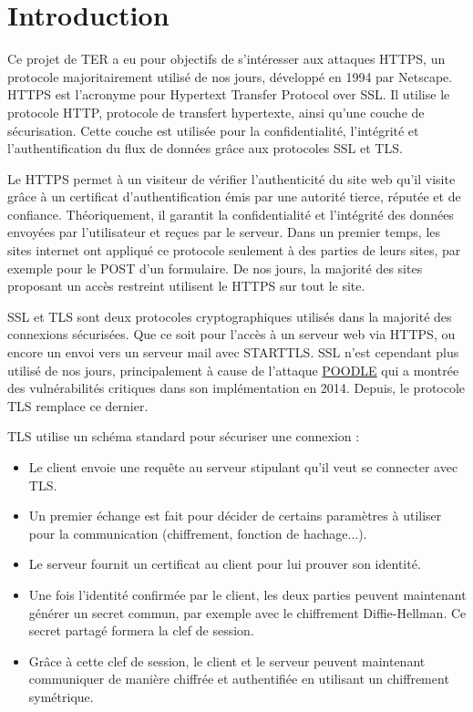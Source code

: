 \chapter*{Introduction}

Ce projet de TER a eu pour objectifs de s'intéresser aux attaques HTTPS, un protocole majoritairement utilisé de nos jours, développé en 1994 par Netscape. HTTPS est l'acronyme pour Hypertext Transfer Protocol over SSL. Il utilise le protocole HTTP, protocole de transfert hypertexte, ainsi qu'une couche de sécurisation. Cette couche est utilisée pour la confidentialité, l'intégrité et l'authentification du flux de données grâce aux protocoles SSL et TLS.

Le HTTPS permet à un visiteur de vérifier l'authenticité du site web qu'il visite grâce à un certificat d'authentification émis par une autorité tierce, réputée et de confiance. Théoriquement, il garantit la confidentialité et l'intégrité des données envoyées par l'utilisateur et reçues par le serveur. Dans un premier temps, les sites internet ont appliqué ce protocole seulement à des parties de leurs sites, par exemple pour le POST d'un formulaire. De nos jours, la majorité des sites proposant un accès restreint utilisent le HTTPS sur tout le site.

SSL et TLS sont deux protocoles cryptographiques utilisés dans la majorité des connexions sécurisées. Que ce soit pour l'accès à un serveur web via HTTPS, ou encore un envoi vers un serveur mail avec STARTTLS. SSL n'est cependant plus utilisé de nos jours, principalement à cause de l'attaque \hyperref[sec:poodle]{POODLE} qui a montrée des vulnérabilités critiques dans son implémentation en 2014. Depuis, le protocole TLS remplace ce dernier.

TLS utilise un schéma standard pour sécuriser une connexion :

\begin{itemize}
    \item Le client envoie une requête au serveur stipulant qu'il veut se connecter avec TLS.
    \item Un premier échange est fait pour décider de certains paramètres à utiliser pour la communication (chiffrement, fonction de hachage...).
    \item Le serveur fournit un certificat au client pour lui prouver son identité.
    \item Une fois l'identité confirmée par le client, les deux parties peuvent maintenant générer un secret commun, par exemple avec le chiffrement Diffie-Hellman. Ce secret partagé formera la clef de session.
    \item Grâce à cette clef de session, le client et le serveur peuvent maintenant communiquer de manière chiffrée et authentifiée en utilisant un chiffrement symétrique.
\end{itemize}

